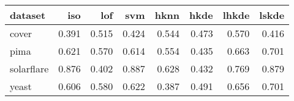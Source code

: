 \begin{tabular}{l|rrr|rrrr}
  \toprule
dataset & iso & lof & svm & hknn & hkde & lhkde & lskde \\ 
  \midrule
cover & 0.391 & 0.515 & 0.424 & 0.544 & 0.473 & 0.570 & 0.416 \\ 
  pima & 0.621 & 0.570 & 0.614 & 0.554 & 0.435 & 0.663 & 0.701 \\ 
  solarflare & 0.876 & 0.402 & 0.887 & 0.628 & 0.432 & 0.769 & 0.879 \\ 
  yeast & 0.606 & 0.580 & 0.622 & 0.387 & 0.491 & 0.656 & 0.701 \\ 
   \bottomrule
\end{tabular}
